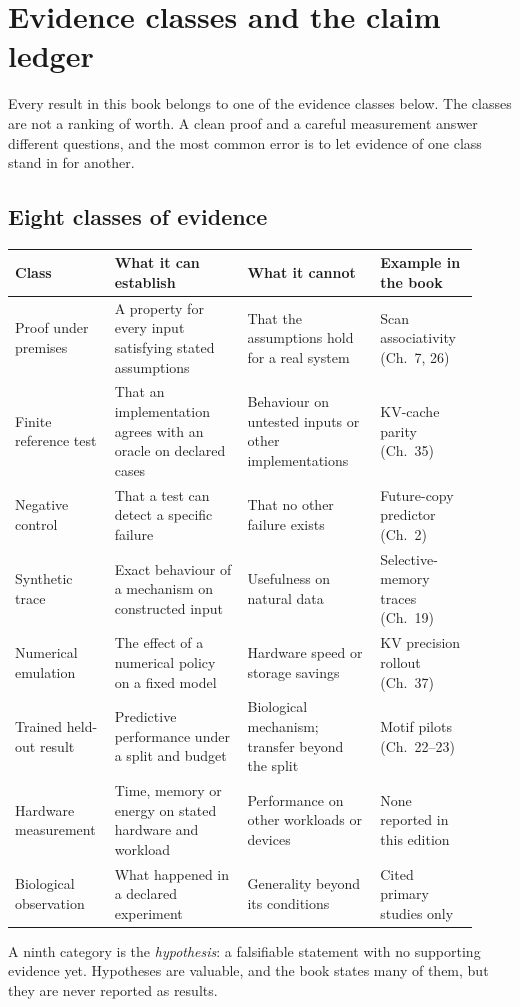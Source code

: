 \chapter{Evidence classes and the claim ledger}
\label{book:appendixC}

Every result in this book belongs to one of the evidence classes below. The classes are
not a ranking of worth. A clean proof and a careful measurement answer different
questions, and the most common error is to let evidence of one class stand in for
another.

\section{Eight classes of evidence}
\begin{center}\small
\begin{tabular}{@{}P{0.18\linewidth}P{0.27\linewidth}P{0.27\linewidth}P{0.20\linewidth}@{}}
\toprule
Class & What it can establish & What it cannot & Example in the book\\\midrule
Proof under premises & A property for every input satisfying stated assumptions &
That the assumptions hold for a real system & Scan associativity (Ch.~7, 26)\\
Finite reference test & That an implementation agrees with an oracle on declared cases &
Behaviour on untested inputs or other implementations & KV-cache parity (Ch.~35)\\
Negative control & That a test can detect a specific failure & That no other failure
exists & Future-copy predictor (Ch.~2)\\
Synthetic trace & Exact behaviour of a mechanism on constructed input & Usefulness on
natural data & Selective-memory traces (Ch.~19)\\
Numerical emulation & The effect of a numerical policy on a fixed model & Hardware
speed or storage savings & KV precision rollout (Ch.~37)\\
Trained held-out result & Predictive performance under a split and budget & Biological
mechanism; transfer beyond the split & Motif pilots (Ch.~22--23)\\
Hardware measurement & Time, memory or energy on stated hardware and workload &
Performance on other workloads or devices & None reported in this edition\\
Biological observation & What happened in a declared experiment & Generality beyond its
conditions & Cited primary studies only\\
\bottomrule
\end{tabular}
\end{center}
A ninth category is the \emph{hypothesis}: a falsifiable statement with no supporting
evidence yet. Hypotheses are valuable, and the book states many of them, but they are
never reported as results.

